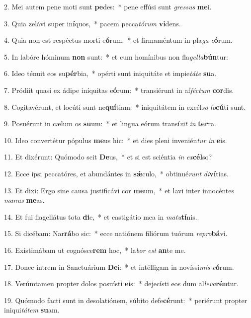 ﻿2. Mei autem pene moti sunt \textbf{pe}des:~* pene effúsi sunt \textit{gres}\textit{sus} \textbf{me}i.

3. Quia zelávi super in\textbf{í}quos,~* pacem pecca\textit{tó}\textit{rum} \textbf{vi}dens.

4. Quia non est respéctus morti e\textbf{ó}rum:~* et firmaméntum in pla\textit{ga} \textit{e}\textbf{ó}rum.

5. In labóre hóminum \textbf{non} sunt:~* et cum homínibus non fla\textit{gel}\textit{la}\textbf{bún}tur:

6. Ideo ténuit eos su\textbf{pér}bia,~* opérti sunt iniquitáte et impie\textit{tá}\textit{te} \textbf{su}a.

7. Pródiit quasi ex ádipe iníquitas e\textbf{ó}rum:~* transiérunt in af\textit{féc}\textit{tum} \textbf{cor}dis.

8. Cogitavérunt, et locúti sunt ne\textbf{quí}tiam:~* iniquitátem in excél\textit{so} \textit{lo}\textbf{cú}ti sunt.

9. Posuérunt in cælum os \textbf{su}um:~* et lingua eórum transí\textit{vit} \textit{in} \textbf{ter}ra.

10. Ideo convertétur pópulus \textbf{me}us hic:~* et dies pleni invenién\textit{tur} \textit{in} \textbf{e}is.

11. Et dixérunt: Quómodo scit \textbf{De}us,~* et si est sciéntia \textit{in} \textit{ex}\textbf{cél}so?

12. Ecce ipsi peccatóres, et abundántes in \textbf{sǽ}culo,~* obtinué\textit{runt} \textit{di}\textbf{ví}tias.

13. Et dixi: Ergo sine causa justificávi cor \textbf{me}um,~* et lavi inter innocéntes \textit{ma}\textit{nus} \textbf{me}as.

14. Et fui flagellátus tota \textbf{di}e,~* et castigátio mea in \textit{ma}\textit{tu}\textbf{tí}nis.

15. Si dicébam: Nar\textbf{rá}bo sic:~* ecce natiónem filiórum tuórum \textit{re}\textit{pro}\textbf{bá}vi.

16. Existimábam ut cognósce\textbf{rem} hoc,~* la\textit{bor} \textit{est} \textbf{an}te me.

17. Donec intrem in Sanctuárium \textbf{De}i:~* et intélligam in novíssi\textit{mis} \textit{e}\textbf{ó}rum.

18. Verúmtamen propter dolos posuísti \textbf{e}is:~* dejecísti eos dum al\textit{le}\textit{va}\textbf{rén}tur.

19. Quómodo facti sunt in desolatiónem, súbito defe\textbf{cé}runt:~* periérunt propter iniqui\textit{tá}\textit{tem} \textbf{su}am.

